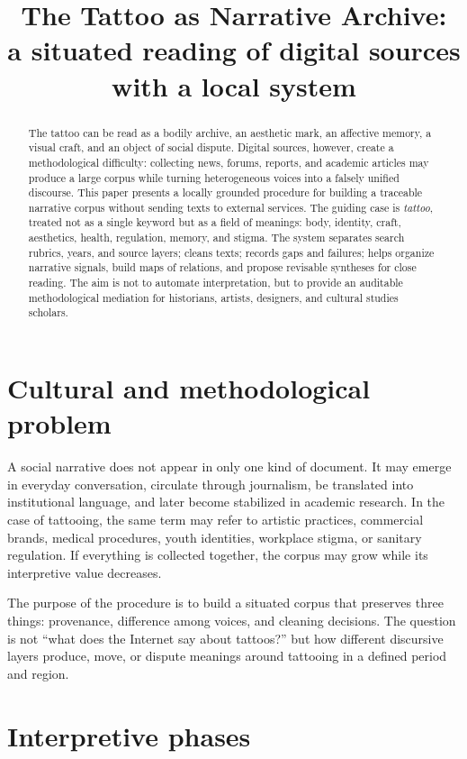 \documentclass[11pt]{article}
\title{The Tattoo as Narrative Archive:\\ a situated reading of digital sources with a local system}
\author{}
\date{}
\begin{document}
\maketitle

\begin{abstract}
The tattoo can be read as a bodily archive, an aesthetic mark, an affective
memory, a visual craft, and an object of social dispute. Digital sources,
however, create a methodological difficulty: collecting news, forums, reports,
and academic articles may produce a large corpus while turning heterogeneous
voices into a falsely unified discourse. This paper presents a locally grounded
procedure for building a traceable narrative corpus without sending texts to
external services. The guiding case is \textit{tattoo}, treated not as a single
keyword but as a field of meanings: body, identity, craft, aesthetics, health,
regulation, memory, and stigma. The system separates search rubrics, years, and
source layers; cleans texts; records gaps and failures; helps organize
narrative signals, build maps of relations, and propose revisable syntheses for
close reading. The aim is not to automate interpretation, but to provide an auditable
methodological mediation for historians, artists, designers, and cultural
studies scholars.
\end{abstract}

\section{Cultural and methodological problem}

A social narrative does not appear in only one kind of document. It may emerge
in everyday conversation, circulate through journalism, be translated into
institutional language, and later become stabilized in academic research. In the
case of tattooing, the same term may refer to artistic practices, commercial
brands, medical procedures, youth identities, workplace stigma, or sanitary
regulation. If everything is collected together, the corpus may grow while its
interpretive value decreases.

The purpose of the procedure is to build a situated corpus that preserves three
things: provenance, difference among voices, and cleaning decisions. The
question is not ``what does the Internet say about tattoos?'' but how different
discursive layers produce, move, or dispute meanings around tattooing in a
defined period and region.

\section{Interpretive phases}
\end{document}
